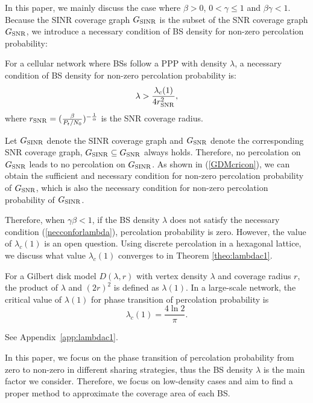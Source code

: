 \documentclass[final]{IEEEtran}
\begin{document}
In this paper, we mainly discuss the case where $\beta>0$, $0<\gamma\leq1$ and $\beta\gamma<1$. Because the SINR coverage graph $G_{\rm SINR}$ is the subset of the SNR coverage graph $G_{\rm SNR}$, we introduce a necessary condition of BS density for non-zero percolation probability:
\begin{theorem}
    For a cellular network where BSs follow a PPP with density $\lambda$, a necessary condition of BS density for non-zero percolation probability is:
\begin{equation}
    \lambda >\frac{\lambda_c(1)}{4r_{\rm SNR}^2},
\label{necconforlambda}
\end{equation}
where $r_{\rm SNR}=(\frac{\beta}{P_t/N_0})^{-\frac{1}{\alpha}}$ is the SNR coverage radius.
\end{theorem}
\begin{IEEEproof}
    Let $G_{\rm SINR}$ denote the SINR coverage graph and $G_{\rm SNR}$ denote the corresponding SNR coverage graph, $G_{\rm SINR}\subseteq G_{\rm SNR}$ always holds. Therefore, no percolation on $G_{\rm SNR}$ leads to no percolation on $G_{\rm SINR}$. As shown in (\ref{GDMcricon}), we can obtain the sufficient and necessary condition for non-zero percolation probability of $G_{\rm SNR}$, which is also the necessary condition for non-zero percolation probability of $G_{\rm SINR}$.
\end{IEEEproof}
Therefore, when $\gamma\beta<1$, if the BS density $\lambda$ does not satisfy the necessary condition (\ref{necconforlambda}), percolation probability is zero. However, the value of $\lambda_c(1)$ is an open question. Using discrete percolation in a hexagonal lattice, we discuss what value $\lambda_c(1)$ converges to in Theorem \ref{theo:lambdac1}.
\begin{theorem}\label{theo:lambdac1}
    For a Gilbert disk model $D(\lambda,r)$ with vertex density $\lambda$ and coverage radius $r$, the product of $\lambda$ and $(2r)^2$ is defined as $\lambda(1)$. In a large-scale network, the critical value of $\lambda(1)$ for phase transition of percolation probability is 
\begin{equation}\label{lambdac1}
    \lambda_c(1)=\frac{4\ln 2}{\pi}.
\end{equation}
\end{theorem}
\begin{IEEEproof}
    See Appendix~\ref{app:lambdac1}.
\end{IEEEproof}

In this paper, we focus on the phase transition of percolation probability from zero to non-zero in different sharing strategies, thus the BS density $\lambda$ is the main factor we consider. Therefore, we focus on low-density cases and aim to find a proper method to approximate the coverage area of each BS. 
\end{document}

